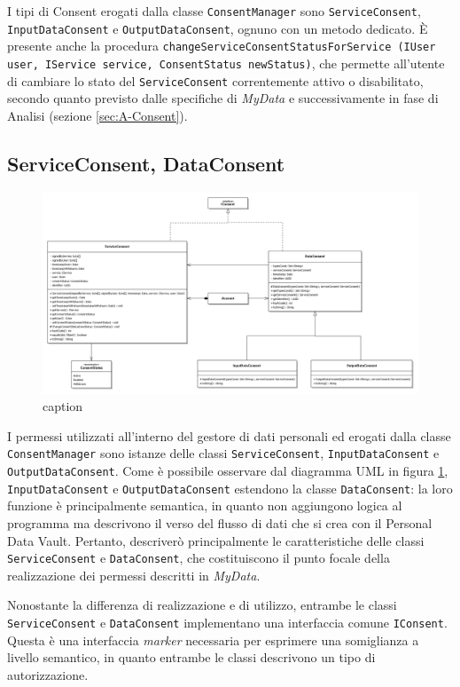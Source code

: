 I tipi di Consent erogati dalla classe \texttt{ConsentManager} sono \texttt{ServiceConsent}, \texttt{InputDataConsent} e \texttt{OutputDataConsent}, ognuno con un metodo dedicato. \`E presente anche la procedura \texttt{changeServiceConsentStatusForService (IUser user, IService service, ConsentStatus newStatus)}, che permette all’utente di cambiare lo stato del \texttt{ServiceConsent} correntemente attivo o disabilitato, secondo quanto previsto dalle specifiche di \textit{MyData} e successivamente in fase di Analisi (sezione \ref{sec:A-Consent}).


\subsection{ServiceConsent, DataConsent}
\label{subsec:P-ServiceConsentDataConsent}
\begin{figure} [h]
	\includegraphics[width=\linewidth]{pictures/Auth-Consents.png}
	\caption{caption}
	\label{fig:Auth-Consents}
\end{figure}
I permessi utilizzati all’interno del gestore di dati personali ed erogati dalla classe \texttt{ConsentManager} sono istanze delle classi \texttt{ServiceConsent}, \texttt{InputDataConsent} e \texttt{OutputDataConsent}. Come \`e possibile osservare dal diagramma UML in figura \ref{fig:Auth-Consents}, \texttt{InputDataConsent} e \texttt{OutputDataConsent} estendono la classe \texttt{DataConsent}: la loro funzione \`e principalmente semantica, in quanto non aggiungono logica al programma ma descrivono il verso del flusso di dati che si crea con il Personal Data Vault. Pertanto, descriver\`o principalmente le caratteristiche delle classi \texttt{ServiceConsent} e \texttt{DataConsent}, che costituiscono il punto focale della realizzazione dei permessi descritti in \textit{MyData}.

Nonostante la differenza di realizzazione e di utilizzo, entrambe le classi \texttt{ServiceConsent} e \texttt{DataConsent} implementano una interfaccia comune \texttt{IConsent}. Questa \`e una interfaccia \textit{marker} necessaria per esprimere una somiglianza a livello semantico, in quanto entrambe le classi descrivono un tipo di autorizzazione.

